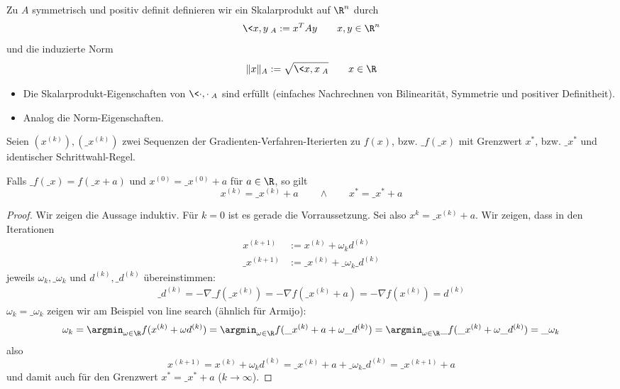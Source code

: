 \documentclass[11pt]{scrbook}
\begin{document}
\begin{df} \label{4.14}
	Zu $A$ symmetrisch und positiv definit definieren wir ein Skalarprodukt auf $\R^n$ durch
	\[
		\<x, y\>_A := x^T A y
		\qquad x,y \in \R^n
	\]
	und die induzierte Norm
	\[
		\|x\|_A := \sqrt{\<x,x\>_A}
		\qquad x \in \R
	\]
	\begin{note}
		\begin{itemize}
			\item
				Die Skalarprodukt-Eigenschaften von $\<\cdot, \cdot\>_A$ sind erfüllt (einfaches Nachrechnen von Bilinearität, Symmetrie und positiver Definitheit).
			\item
				Analog die Norm-Eigenschaften.
		\end{itemize}
	\end{note}
\end{df}

\begin{lem*}[Translationsinvarianz]
	Seien $(x^{(k)}), (\_x^{(k)})$ zwei Sequenzen der Gradienten-Verfahren-Iterierten zu $f(x)$, bzw. $\_f(\_x)$ mit Grenzwert $x^*$, bzw. $\_x^*$ und identischer Schrittwahl-Regel.

	Falls $\_f(\_x) = f(\_x + a)$ und $x^{(0)} = \_x^{(0)} + a$ für $a \in \R$, so gilt
	\[
		x^{(k)} = \_x^{(k)} + a
		\qquad \land \qquad
		x^* = \_x^* + a
	\]
	\begin{proof}
		Wir zeigen die Aussage induktiv.
		Für $k=0$ ist es gerade die Vorraussetzung.
		Sei also $x^{k} = \_x^{(k)} + a$.
		Wir zeigen, dass in den Iterationen
		\begin{align*}
			x^{(k+1)} &:= x^{(k)} + \omega_k d^{(k)} \\
			\_x^{(k+1)} &:= \_x^{(k)} + \_\omega_k \_d^{(k)}
		\end{align*}
		jeweils $\omega_k, \_\omega_k$ und $d^{(k)}, \_d^{(k)}$ übereinstimmen:
		\begin{align*}
			\_d^{(k)} = -\nabla \_f(\_x^{(k)}) = - \nabla f(\_x^{(k)} + a) = - \nabla f(x^{(k)}) = d^{(k)}
		\end{align*}
		$\omega_k = \_\omega_k$ zeigen wir am Beispiel von line search (ähnlich für Armijo):
		\[
			\omega_k = \argmin_{\omega\in\R} f(x^{(k)} + \omega d^{(k)}) = \argmin_{\omega\in \R} f(\_x^{(k)} + a + \omega \_d^{(k)})  = \argmin_{\omega\in \R} \_f(\_x^{(k)} + \omega \_d^{(k)}) = \_\omega_k
		\]
		also
		\[
			x^{(k+1)} = x^{(k)} + \omega_k d^{(k)} = \_x^{(k)} + a + \_\omega_k \_d^{(k)} =\_ x^{(k+1)} +a
		\]
		und damit auch für den Grenzwert $x^* = \_x^* + a$ ($k \to \infty$).
	\end{proof}
\end{lem*}
\end{document}

